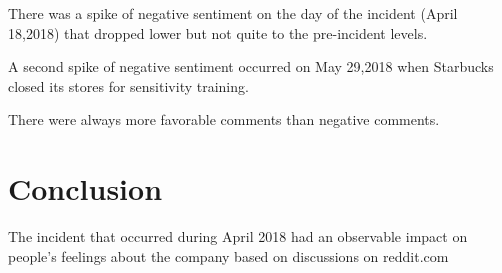 \documentclass[11pt]{article}
\begin{document}
There was a spike of negative sentiment on the day of the incident
(April 18,2018) that dropped lower but not quite to the pre-incident
levels.

A second spike of negative sentiment occurred on May 29,2018 when
Starbucks closed its stores for sensitivity training.

There were always more favorable comments than negative comments.

    \section{Conclusion}\label{conclusion}

    The incident that occurred during April 2018 had an observable impact on
people's feelings about the company based on discussions on reddit.com


    
    
    
    
\end{document}
